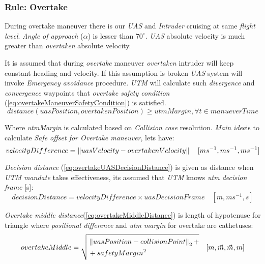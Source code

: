 \subsubsection{Rule: Overtake}
    \noindent During overtake maneuver there is our \emph{UAS} and \emph{Intruder} cruising at same \emph{flight level}. \emph{Angle of approach} ($\alpha$) is lesser than $70^\circ$. \emph{UAS} absolute velocity is much greater than \emph{overtaken} absolute velocity. 
    
    It is assumed that during \emph{overtake} maneuver \emph{overtaken} intruder will keep constant heading and velocity. If this assumption is broken \emph{UAS} system will invoke \emph{Emergency avoidance} procedure. \emph{UTM} will calculate such \emph{divergence} and \emph{convergence} waypoints that \emph{overtake safety condition} (\ref{eq:overtakeManeuverSafetyCondition}) is satisfied.
    \begin{equation}\label{eq:overtakeManeuverSafetyCondition}
            distance(uasPosition,overtakenPosition) \ge utmMargin, \forall t\in manueverTime
    \end{equation}
    
    \noindent Where \emph{utmMargin} is calculated based on \emph{Collision case} resolution. \emph{Main idea}is to calculate \emph{Safe offset for Overtake maneuver}, lets have:
    \begin{equation}\label{eq:overtakeVelocityDifference}
        velocityDifference=\left\lVert uasVelocity-overtakenVelocity\right\rVert\quad [ms^{-1},ms^{-1},ms^{-1}]
    \end{equation}
    
    \noindent \emph{Decision distance} (\ref{eq:overtakeUASDecisionDistance}) is given as distance when \emph{UTM mandate} takes effectiveness, its assumed that \emph{UTM} knows \emph{utm decision frame} [s]:
    \begin{equation}\label{eq:overtakeUASDecisionDistance}
        decisionDistance =  velocityDifference \times uasDecisionFrame\quad [m,ms^{-1},s]    
    \end{equation}
    
    \noindent \emph{Overtake middle distance}(\ref{eq:overtakeMiddleDistance}) is length of hypotenuse for triangle where \emph{positional difference} and \emph{utm margin} for overtake are cathetuses:
    \begin{equation}\label{eq:overtakeMiddleDistance}
        overtakeMiddle=\sqrt{\begin{aligned}&\left\lVert uasPosition - collisionPoint\right\rVert_2+\\ &+ safetyMargin^2 \end{aligned}}\quad [m,\vec{m},\vec{m},m]
    \end{equation}
    
